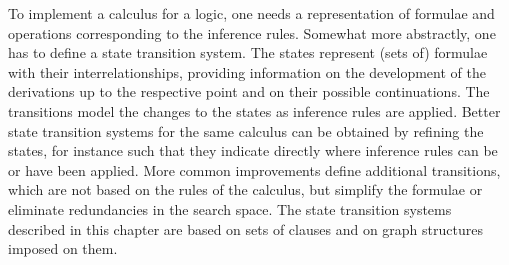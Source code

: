To implement a calculus for a logic, one needs a representation of formulae and
operations corresponding to the inference rules. Somewhat more abstractly, one
has to define a state transition system. The states represent (sets of) formulae
with their interrelationships, providing information on the development of the
derivations up to the respective point and on their possible continuations. The
transitions model the changes to the states as inference rules are applied.
Better state transition systems for the same calculus can be obtained by
refining the states, for instance such that they indicate directly where
inference rules can be or have been applied. More common improvements define
additional transitions, which are not based on the rules of the calculus, but
simplify the formulae or eliminate redundancies in the search space. The state
transition systems described in this chapter are based on sets of clauses and on
graph structures imposed on them.
